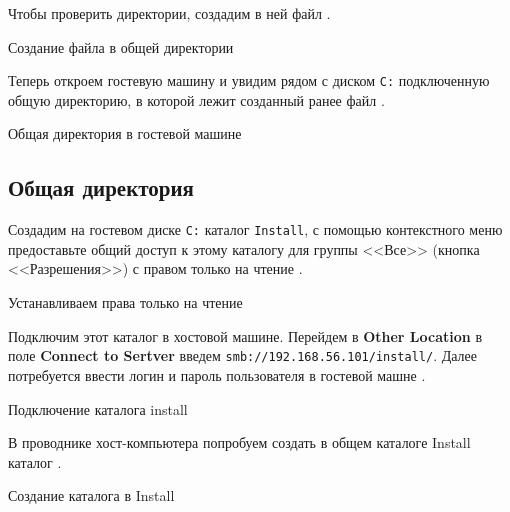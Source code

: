 Чтобы проверить директории, создадим в ней файл .

\begin{image}
	\caption{Создание файла в общей директории}
	\label{fig:shared:dir:file}
\end{image}

Теперь откроем гостевую машину и увидим рядом с диском \texttt{C:}
подключенную общую директорию, в которой лежит созданный ранее файл
.

\begin{image}
	\caption{Общая директория в гостевой машине}
	\label{fig:shared:dir:file:win}
\end{image}

\subsection{Общая директория}

Создадим на гостевом диске \texttt{С:} каталог \texttt{Install},
с помощью контекстного меню предоставьте общий доступ
к этому каталогу для группы <<Все>> (кнопка <<Разрешения>>)
с правом только на чтение .

\begin{image}
	\caption{Устанавливаем права только на чтение}
	\label{fig:dir:inst:r}
\end{image}

Подключим этот каталог в хостовой машине. Перейдем в \textbf{Other Location}
в поле \textbf{Connect to Sertver} введем
\texttt{smb://192.168.56.101/install/}.
Далее потребуется ввести логин и пароль пользователя в гостевой машне
.

\begin{image}
	\caption{Подключение каталога install}
	\label{fig:dir:inst:open}
\end{image}

В проводнике хост-компьютера попробуем создать
в общем каталоге Install каталог
.

\begin{image}
	\caption{Создание каталога в Install}
	\label{fig:dir:inst:r:create:folder}
\end{image}

